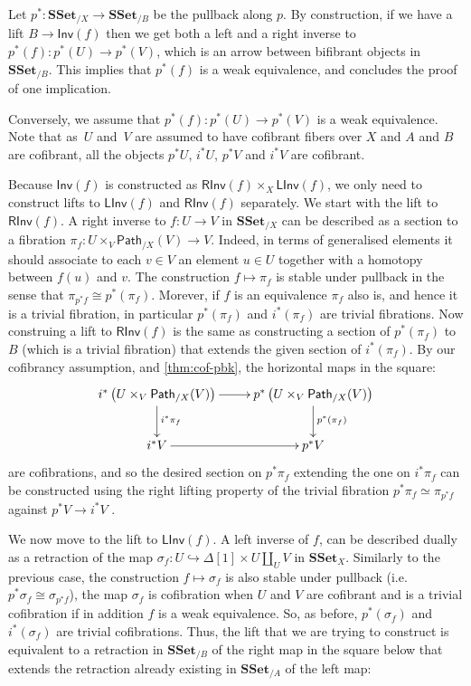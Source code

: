 \documentclass[reqno,10pt,a4paper,oneside]{amsart}
\makeatletter
\renewenvironment{proof}[1][\proofname] {\par\pushQED{\qed}\normalfont\topsep6\p@\@plus6\p@\relax\trivlist\item[\hskip\labelsep\bf#1\@addpunct{.}]\ignorespaces}{\popQED\endtrivlist\@endpefalse}
\numberwithin{equation}{section}
\theoremstyle{mythm}
\theoremstyle{mydef}
\theoremstyle{myrmk}
\newcommand{\co}{\colon}
\newcommand{\SSet}{\mathbf{SSet}}
\newcommand{\Iseq}{\mathsf{Inv}}
\newcommand{\Linv}{\mathsf{LInv}}
\newcommand{\Rinv}{\mathsf{RInv}}
\newcommand{\Path}{\mathsf{Path}}
\makeatother
\begin{document}
\begin{proof} Let  $p^* \co \SSet_{/X} \to \SSet_{/B}$ be the pullback along $p$.
 By construction, if we have a lift $B \to \Iseq(f)$ then we get both a left and a right inverse to $p^*(f) \co p^*(U) \to p^*(V)$, which is an arrow between bifibrant objects in $\SSet_{/B}$. This implies that $p^*(f)$ is a weak equivalence, and concludes the proof of one implication.

Conversely, we assume that $p^*(f): p^*(U) \to p^*(V)$ is a weak equivalence. Note that as~$U$ and~$V$ are assumed to have cofibrant fibers over $X$ and $A$ and $B$ are cofibrant, all the objects $p^*U$, $i^*U$, $p^*V$ and $i^* V$ are cofibrant.

Because $\Iseq(f)$ is constructed as $\Rinv(f) \times_X \Linv(f)$, we only need to construct lifts to $\Linv(f)$ and $\Rinv(f)$ separately. We start with the lift to $\Rinv(f)$. A right inverse to $f : U \to V$ in $\SSet_{/X}$ can be described as a section to a fibration $\pi_f: U \times_V \Path_{/X}(V) \to V$. Indeed, in terms of generalised elements it should associate to each $v \in V$ an element $u\in U$ together with a homotopy between $f(u)$ and $v$. The construction  $f \mapsto \pi_f$ is stable under pullback in the sense that $\pi_{p^* f} \cong p^*(\pi_f)$. Morever, if $f$ is an equivalence $\pi_f$ also is, and hence it is a trivial fibration, in particular $p^*(\pi_f)$ and $i^*(\pi_f)$ are trivial fibrations. Now construing a lift to $\Rinv(f)$ is the same as constructing a section of $p^*(\pi_f)$ to $B$ (which is a trivial fibration) that extends the given section of $i^*(\pi_f)$. By our cofibrancy assumption, and \cref{thm:cof-pbk}, the horizontal maps in the square:
\[
\xymatrix{  i^*\left( U \times_V \Path_{/X}(V) \right) \ar[r] \ar[d]^{i^* \pi_f} & p^*\left( U \times_V \Path_{/X}(V) \right)  \ar[d]^{p^*(\pi_f)} \\
i^*V \ar[r] & p^* V
}
\]
are cofibrations, and so the desired section on $p^*\pi_f$ extending the one on $i^*\pi_f$ can be constructed using the right lifting property of the trivial fibration $p^* \pi_f \simeq \pi_{p^* f}$ against $p^*V \to i^* V$ .

  
We now move to the lift to $\Linv(f)$. A left inverse of $f$, can be described dually as a retraction of the map $\sigma_f: U \hookrightarrow \Delta[1] \times U \coprod_U V$ in $\SSet_X$. Similarly to the previous case, the construction $f \mapsto \sigma_f$ is also stable under pullback (i.e. $p^*\sigma_f \cong \sigma_{p^* f}$), the map $\sigma_f$ is cofibration when $U$ and $V$ are cofibrant and is a trivial cofibration if in addition $f$ is a weak equivalence. So, as before, $p^*(\sigma_f)$ and $i^*(\sigma_f)$ are trivial cofibrations. Thus, the lift that we are trying to construct is equivalent to a retraction in $\SSet_{/B}$ of the right map in the square below that extends the retraction already existing in $\SSet_{/A}$ of the left map:


\end{proof}
\end{document}
